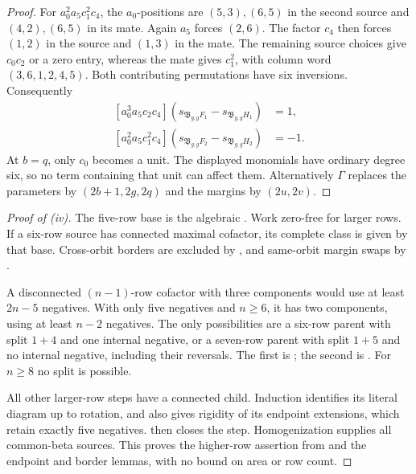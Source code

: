 \documentclass[11pt,a4paper]{amsart}
\numberwithin{equation}{section}
\theoremstyle{plain}
\theoremstyle{definition}
\newcommand{\B}{\mathfrak B}
\begin{document}
\begin{proof}
For \(a_0^2a_5c_1^2c_4\), the \(a_0\)-positions are
\((5,3),(6,5)\) in the second source and \((4,2),(6,5)\) in
its mate.  Again \(a_5\) forces \((2,6)\).  The factor \(c_4\)
then forces \((1,2)\) in the source and \((1,3)\) in the mate.  
The remaining source choices give \(c_0c_2\) or a zero entry,
whereas the mate gives \(c_1^2\), with column word
\((3,6,1,2,4,5)\).  Both contributing permutations have six
inversions.  Consequently
\begin{equation}\label{eq:five-border-separators}
 \begin{aligned}
 [a_0^3a_5c_2c_4](s_{\B_{g,g}F_1}-s_{\B_{g,g}H_1})&=1,\\
 [a_0^2a_5c_1^2c_4](s_{\B_{g,g}F_2}-s_{\B_{g,g}H_2})&=-1.
 \end{aligned}
\end{equation}
At \(b=q\), only \(c_0\) becomes a unit.  The displayed monomials have
ordinary degree six, so no term containing that unit can affect them.
Alternatively \(\Gamma\) replaces the parameters by
\((2b+1,2g,2q)\) and the margins by \((2u,2v)\).
\end{proof}

\begin{proof}[Proof of (iv)]
The five-row base is the algebraic .  
Work zero-free for larger rows.  If a six-row source has connected maximal
cofactor, its complete class is given by that base.  Cross-orbit borders
are excluded by , and same-orbit
margin swaps by .

A disconnected \((n-1)\)-row cofactor with three components would use
at least \(2n-5\) negatives.  With only five negatives and \(n\ge6\),
it has two components, using at least \(n-2\) negatives.  The only
possibilities are a six-row parent with split \(1+4\) and one internal
negative, or a seven-row parent with split \(1+5\) and no internal
negative, including their reversals.  The first is
; the second is .
For \(n\ge8\) no split is possible.

All other larger-row steps have a connected child.  Induction identifies
its literal diagram up to rotation, and also gives rigidity of its
endpoint extensions, which retain exactly five negatives.
 then closes the step.  Homogenization supplies all
common-beta sources.  This proves the higher-row assertion from
 and the endpoint and border lemmas, with no bound
on area or row count.
\end{proof}
\end{document}
